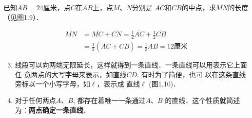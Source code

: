 \begin{figure}[htp]\centering
    \begin{minipage}[t]{0.48\textwidth}
    \centering
{}
    \caption{}
    \end{minipage}
    \begin{minipage}[t]{0.48\textwidth}
    \centering
    \caption{}
    \end{minipage}
    \end{figure}



\begin{example}
	已知$\overline{AB}=24$厘米，点$C$在$\overline{AB}$上，点$M$、$N$分别是
	$\overline{AC}$和$\overline{CB}$的中点，求$\overline{MN}$的长度（见图1.9）．
\end{example}

\begin{solution}
\[\begin{split}
	\overline{MN}&=\overline{MC}+\overline{CN}=\frac{1}{2}\overline{AC}+\frac{1}{2}\overline{CB}\\
	&=\frac{1}{2}\left(\overline{AC}+\overline{CB}\right)=\frac{1}{2}\overline{AB}=12\text{厘米}
\end{split}\]
\end{solution}

\begin{enumerate}\setcounter{enumi}{2} 
	\item 线段可以向两端无限延长，这样就得到一条直线．一条直线可以用表示它上面任
	意两点的大写字母来表示，如直线$CD$. 有时为了简便，也可
	以在这条直线旁标以一个小写字母，如$\ell$，表示成
	直线$\ell $ (图1.10)．
	\item 对于任何两点$A$、$B$, 都存在着唯一一条通过$A$、$B$
	的直线．这个性质就简述为：\textbf{两点确定一条直线}．
\end{enumerate}

